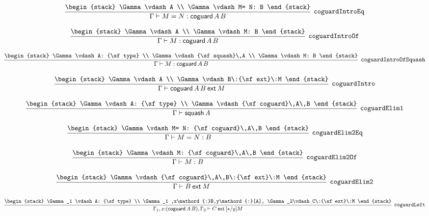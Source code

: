 \[
\infer[{\tt coguardIntroEq}]{\Gamma \vdash M= N: {\sf coguard}\,A\,B}{
\begin{stack}
\Gamma \vdash A
\\
\Gamma \vdash M= N: B
\end{stack}}
\]

\[
\infer[{\tt coguardIntroOf}]{\Gamma \vdash M: {\sf coguard}\,A\,B}{
\begin{stack}
\Gamma \vdash A
\\
\Gamma \vdash M: B
\end{stack}}
\]

\[
\infer[{\tt coguardIntroOfSquash}]{\Gamma \vdash M: {\sf coguard}\,A\,B}{
\begin{stack}
\Gamma \vdash A: {\sf type}
\\
\Gamma \vdash {\sf squash}\,A
\\
\Gamma \vdash M: B
\end{stack}}
\]

\[
\infer[{\tt coguardIntro}]{\Gamma \vdash {\sf coguard}\,A\,B\:{\sf ext}\:M}{
\begin{stack}
\Gamma \vdash A
\\
\Gamma \vdash B\:{\sf ext}\:M
\end{stack}}
\]

\[
\infer[{\tt coguardElim1}]{\Gamma \vdash {\sf squash}\,A}{
\begin{stack}
\Gamma \vdash A: {\sf type}
\\
\Gamma \vdash {\sf coguard}\,A\,B
\end{stack}}
\]

\[
\infer[{\tt coguardElim2Eq}]{\Gamma \vdash M= N: B}{
\begin{stack}
\Gamma \vdash M= N: {\sf coguard}\,A\,B
\end{stack}}
\]

\[
\infer[{\tt coguardElim2Of}]{\Gamma \vdash M: B}{
\begin{stack}
\Gamma \vdash M: {\sf coguard}\,A\,B
\end{stack}}
\]

\[
\infer[{\tt coguardElim2}]{\Gamma \vdash B\:{\sf ext}\:M}{
\begin{stack}
\Gamma \vdash {\sf coguard}\,A\,B\:{\sf ext}\:M
\end{stack}}
\]

\[
\infer[{\tt coguardLeft}]{\Gamma_1 ,x\mathord{:}({\sf coguard}\,A\,B), \Gamma_2 \vdash C\:{\sf ext}\:[\star /y]M}{
\begin{stack}
\Gamma_1 \vdash A: {\sf type}
\\
\Gamma_1 ,x\mathord{:}B,y\mathord{:}[A], \Gamma_2\vdash C\:{\sf ext}\:M
\end{stack}}
\]

